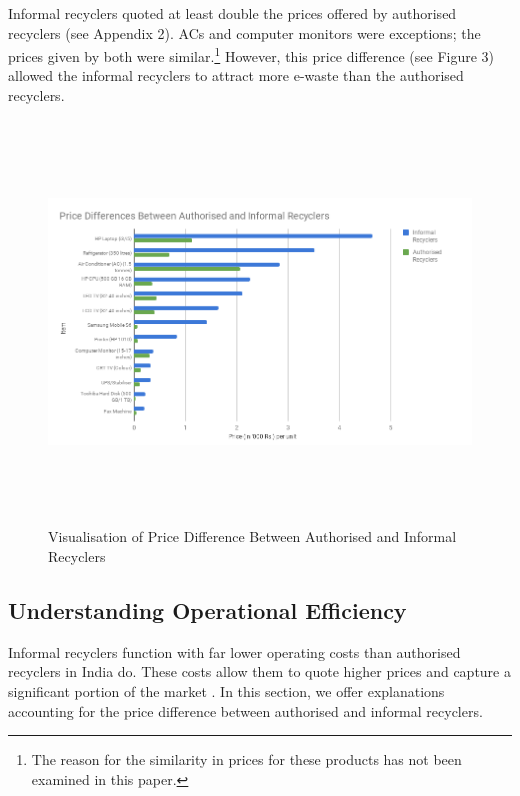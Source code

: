 \documentclass[a4paper, 12pt]{article}
\begin{document}
                     Informal recyclers quoted at least double the prices offered by authorised recyclers (see Appendix 2). ACs and computer monitors were exceptions; the prices given by both were similar.\footnote{The reason for the similarity in prices for these products has not been examined in this paper.} However, this price difference (see Figure 3) allowed the informal recyclers to attract more e-waste than the authorised recyclers. \\
                                        
\begin{figure}[H]
\flushleft
\includegraphics[height= 4.20in]{fig3.png}
\caption[Optional Caption]{Visualisation of Price Difference Between Authorised and Informal Recyclers}
\end{figure}
                    
\subsection{Understanding Operational Efficiency}
                    
                    Informal recyclers function with far lower operating costs than authorised recyclers in India do. These costs allow them to quote higher prices and capture a significant portion of the market \parencite{chintanreport}. In this section, we offer explanations accounting for the price difference between authorised and informal recyclers. 
                    
\end{document}
